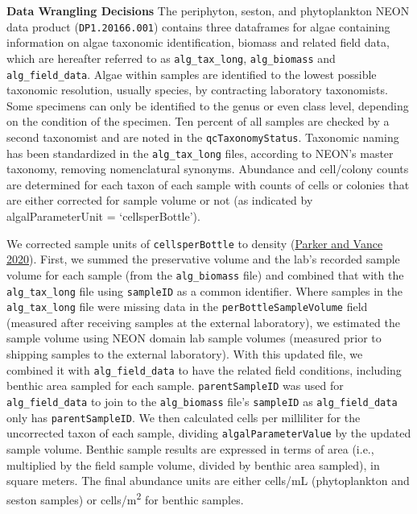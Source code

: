 \documentclass[
  12pt,
]{article}
\begin{document}
\textbf{Data Wrangling Decisions} The periphyton, seston, and phytoplankton NEON data product (\texttt{DP1.20166.001}) contains three dataframes for algae containing information on algae taxonomic identification, biomass and related field data, which are hereafter referred to as \texttt{alg\_tax\_long}, \texttt{alg\_biomass} and \texttt{alg\_field\_data}. Algae within samples are identified to the lowest possible taxonomic resolution, usually species, by contracting laboratory taxonomists. Some specimens can only be identified to the genus or even class level, depending on the condition of the specimen. Ten percent of all samples are checked by a second taxonomist and are noted in the \texttt{qcTaxonomyStatus}. Taxonomic naming has been standardized in the \texttt{alg\_tax\_long} files, according to NEON's master taxonomy, removing nomenclatural synonyms. Abundance and cell/colony counts are determined for each taxon of each sample with counts of cells or colonies that are either corrected for sample volume or not (as indicated by algalParameterUnit = `cellsperBottle').

We corrected sample units of \texttt{cellsperBottle} to density (\protect\hyperlink{ref-ParkerVance2020}{Parker and Vance 2020}). First, we summed the preservative volume and the lab's recorded sample volume for each sample (from the \texttt{alg\_biomass} file) and combined that with the \texttt{alg\_tax\_long} file using \texttt{sampleID} as a common identifier. Where samples in the \texttt{alg\_tax\_long} file were missing data in the \texttt{perBottleSampleVolume} field (measured after receiving samples at the external laboratory), we estimated the sample volume using NEON domain lab sample volumes (measured prior to shipping samples to the external laboratory). With this updated file, we combined it with \texttt{alg\_field\_data} to have the related field conditions, including benthic area sampled for each sample. \texttt{parentSampleID} was used for \texttt{alg\_field\_data} to join to the \texttt{alg\_biomass} file's \texttt{sampleID} as \texttt{alg\_field\_data} only has \texttt{parentSampleID}. We then calculated cells per milliliter for the uncorrected taxon of each sample, dividing \texttt{algalParameterValue} by the updated sample volume. Benthic sample results are expressed in terms of area (i.e., multiplied by the field sample volume, divided by benthic area sampled), in square meters. The final abundance units are either cells/mL (phytoplankton and seston samples) or cells/m\textsuperscript{2} for benthic samples.
\end{document}
